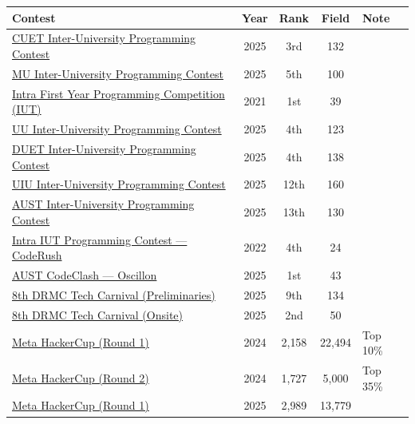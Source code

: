 \documentclass[10pt]{article}
\begin{document}
{\small
\begin{longtable}{@{}p{7.6cm} c c c l@{}}
\toprule
\textbf{Contest} & \textbf{Year} & \textbf{Rank} & \textbf{Field} & \textbf{Note} \\
\midrule
\endhead
\href{https://toph.co/c/cuet-iupc-2025/standings}{CUET Inter-University Programming Contest} & 2025 & 3rd & 132 & \\
\href{https://toph.co/c/inter-university-mu-cse-fest-2025/standings}{MU Inter-University Programming Contest} & 2025 & 5th & 100 & \\
\href{https://toph.co/contests/training/teukrhr/standings}{Intra First Year Programming Competition (IUT)} & 2021 & 1st & 39 & \\
\href{https://toph.co/c/uttara-university-inter-university-2025/standings}{UU Inter-University Programming Contest} & 2025 & 4th & 123 & \\
\href{https://toph.co/c/duet-inter-university-iupc-2025/standings}{DUET Inter-University Programming Contest} & 2025 & 4th & 138 & \\
\href{https://bapsoj.org/contests/uiu-inter-university-programming-contest-2025/standings}{UIU Inter-University Programming Contest} & 2025 & 12th & 160 & \\
\href{https://toph.co/c/mtb-presents-aust-inter-university-2025/standings}{AUST Inter-University Programming Contest} & 2025 & 13th & 130 & \\
\href{https://cse.iutoic-dhaka.edu/news/coderush-1-0}{Intra IUT Programming Contest --- CodeRush} & 2022 & 4th & 24 & \\
\href{https://toph.co/c/codeclash-oscillon-2025/standings}{AUST CodeClash --- Oscillon} & 2025 & 1st & 43 & \\
\href{https://toph.co/c/preliminary-8th-drmc-intl-tech-carnival-2025/standings}{8th DRMC Tech Carnival (Preliminaries)} & 2025 & 9th & 134 & \\
\href{https://toph.co/c/preliminary-8th-drmc-intl-tech-carnival-2025/standings}{8th DRMC Tech Carnival (Onsite)} & 2025 & 2nd & 50 & \\
\href{https://www.facebook.com/codingcompetitions/hacker-cup/2024/certificate/1519485338929641}{Meta HackerCup (Round 1)} & 2024 & 2{,}158 & 22{,}494 & Top 10\% \\
\href{https://www.facebook.com/codingcompetitions/hacker-cup/2024/certificate/1519485338929641}{Meta HackerCup (Round 2)} & 2024 & 1{,}727 & 5{,}000 & Top 35\% \\
\href{https://www.facebook.com/codingcompetitions/hacker-cup/2025/certificate/1519485338929641?source=facebook}{Meta HackerCup (Round 1)} & 2025 & 2{,}989 & 13{,}779 & \\

\end{longtable}}
\end{document}
